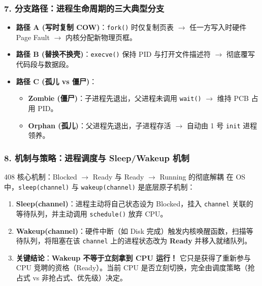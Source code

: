 \documentclass[11pt,a4paper,openany]{ctexbook}
\newcommand{\key}[1]{\textbf{\color{deep}#1}}
\begin{document}
\subsubsection*{7. 分支路径：进程生命周期的三大典型分支}
\begin{itemize}[leftmargin=1.5em]
  \item \textbf{路径 A (写时复制 COW)}：\texttt{fork()} 时仅复制页表 $\rightarrow$ 任一方写入时硬件 Page Fault $\rightarrow$ 内核分配新物理页框。
  \item \textbf{路径 B (替换不换壳)}：\texttt{execve()} 保持 PID 与打开文件描述符 $\rightarrow$ 彻底覆写代码段与数据段。
  \item \textbf{路径 C (孤儿 vs 僵尸)}：
    \begin{itemize}
      \item \textbf{Zombie (僵尸)}：子进程先退出，父进程未调用 \texttt{wait()} $\rightarrow$ 维持 PCB 占用 PID。
      \item \textbf{Orphan (孤儿)}：父进程先退出，子进程存活 $\rightarrow$ 自动由 1 号 \texttt{init} 进程领养。
    \end{itemize}
\end{itemize}

\subsubsection*{8. 机制与策略：进程调度与 Sleep/Wakeup 机制}
\begin{methodbox}{408 核心机制：Blocked $\rightarrow$ Ready 与 Ready $\rightarrow$ Running 的彻底解耦}
在 OS 中，\texttt{sleep(channel)} 与 \texttt{wakeup(channel)} 是底层原子机制：
\begin{enumerate}
  \item \textbf{Sleep(channel)}：进程主动将自己状态设为 Blocked，挂入 \texttt{channel} 关联的等待队列，并主动调用 \texttt{schedule()} 放弃 CPU。
  \item \textbf{Wakeup(channel)}：硬件中断（如 Disk 完成）触发内核唤醒函数，扫描等待队列，将阻塞在该 \texttt{channel} 上的进程状态改为 \key{Ready} 并移入就绪队列。
  \item \textbf{关键结论}：\textbf{Wakeup 不等于立刻拿到 CPU 运行！} 它只是获得了重新参与 CPU 竞聘的资格（Ready）。当前 CPU 是否立刻切换，完全由调度策略（抢占式 vs 非抢占式、优先级）决定。
\end{enumerate}
\end{methodbox}
\end{document}

